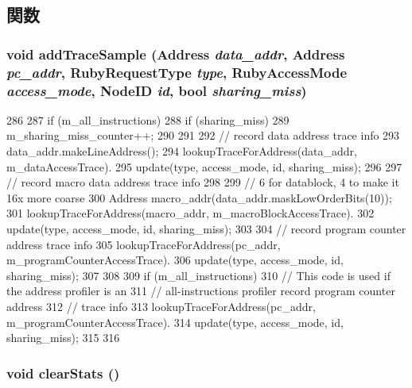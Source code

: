 \subsection{関数}
\hypertarget{classAddressProfiler_ada40ab5186eed63c4af52be6bfea3cab}{
\subsubsection[{addTraceSample}]{\setlength{\rightskip}{0pt plus 5cm}void addTraceSample ({\bf Address} {\em data\_\-addr}, \/  {\bf Address} {\em pc\_\-addr}, \/  RubyRequestType {\em type}, \/  RubyAccessMode {\em access\_\-mode}, \/  {\bf NodeID} {\em id}, \/  bool {\em sharing\_\-miss})}}
\label{classAddressProfiler_ada40ab5186eed63c4af52be6bfea3cab}



\begin{DoxyCode}
286 {
287     if (m_all_instructions) {
288         if (sharing_miss) {
289             m_sharing_miss_counter++;
290         }
291 
292         // record data address trace info
293         data_addr.makeLineAddress();
294         lookupTraceForAddress(data_addr, m_dataAccessTrace).
295             update(type, access_mode, id, sharing_miss);
296 
297         // record macro data address trace info
298 
299         // 6 for datablock, 4 to make it 16x more coarse
300         Address macro_addr(data_addr.maskLowOrderBits(10));
301         lookupTraceForAddress(macro_addr, m_macroBlockAccessTrace).
302             update(type, access_mode, id, sharing_miss);
303 
304         // record program counter address trace info
305         lookupTraceForAddress(pc_addr, m_programCounterAccessTrace).
306             update(type, access_mode, id, sharing_miss);
307     }
308 
309     if (m_all_instructions) {
310         // This code is used if the address profiler is an
311         // all-instructions profiler record program counter address
312         // trace info
313         lookupTraceForAddress(pc_addr, m_programCounterAccessTrace).
314             update(type, access_mode, id, sharing_miss);
315     }
316 }
\end{DoxyCode}
\hypertarget{classAddressProfiler_ac7ec7476159db4e2bb0372e30010fc9e}{
\subsubsection[{clearStats}]{\setlength{\rightskip}{0pt plus 5cm}void clearStats ()}}
\label{classAddressProfiler_ac7ec7476159db4e2bb0372e30010fc9e}




